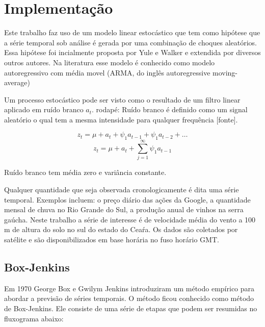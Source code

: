 \documentclass[
	12pt,				%
	openright,			%
	oneside,			%
	a4paper,			%
	english,			%
	french,				%
	spanish,			%
	brazil				%
	]{abntex2}
\begin{document}
\part{Implementação}

Este trabalho faz uso de um modelo linear estocástico que tem como hipótese que a série temporal sob análise é gerada por uma combinação de choques aleatórios. Essa hipótese foi incialmente proposta por Yule e Walker e extendida por diversos outros autores.
Na literatura esse modelo é conhecido como modelo autoregressivo com média movel (ARMA, do inglês autoregressive moving-average)

Um processo estocástico pode ser visto como o resultado de um filtro linear aplicado em ruído branco $a_t$. 
rodapé: Ruído branco é definido como um signal aleatório o qual tem a mesma intensidade para qualquer frequência [fonte].

$$ z_t = \mu + a_t + \psi_1a_{t-1} + \psi_1a_{t-2} + \dots $$
$$ z_t = \mu + a_t + \sum_{j=1}^{\infty}\psi_1a_{t-1} $$

Ruído branco tem média zero e variância constante. 



Qualquer quantidade que seja observada cronologicamente é dita uma série temporal. Exemplos incluem: o preço diário das ações da Google, a quantidade mensal de chuva no Rio Grande do Sul, a produção anual de vinhos na serra gaúcha. Neste trabalho a série de interesse é de velocidade média do vento a 100 m de altura do solo no sul do estado do Ceaŕa. Os dados são coletados por satélite e são disponibilizados em base horária no fuso horário GMT. 


\chapter{Box-Jenkins}

Em 1970 George Box e Gwilym Jenkins introduziram um método empírico para abordar a previsão de séries temporais. O método ficou conhecido como método de Box-Jenkins. Ele consiste de uma série de etapas que podem ser resumidas no fluxograma abaixo:
\end{document}
